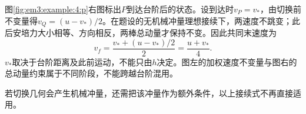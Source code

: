 \begin{solution}
图\ref{fig:em3:example:4:p}右图标出$P$到达台阶后的状态。设到达时$v_P=v_*$，由切换前不变量得$v_Q=(u-v_*)/2$。在题设的无机械冲量理想接续下，两速度不跳变；此后安培力大小相等、方向相反，两棒总动量才保持不变。因此共同末速度为
\[
 \boxed{v_f=\frac{v_*+(u-v_*)/2}{2}=\frac{u+v_*}{4}}.
\]
$v_*$取决于台阶距离及此前运动，不能只由$h$决定。图左的加权速度不变量与图右的总动量约束属于不同阶段，不能跨越台阶混用。

若切换几何会产生机械冲量，还需把该冲量作为额外条件，以上接续式不再直接适用。
\end{solution}
